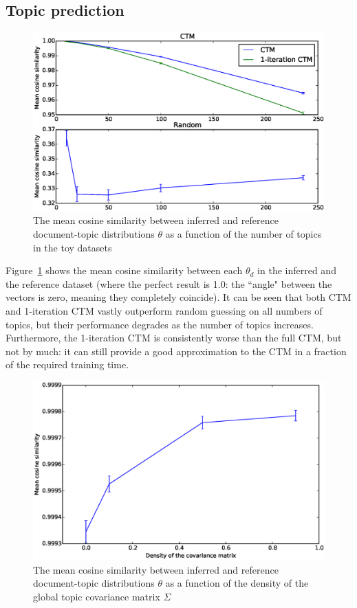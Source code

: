 \documentclass[12pt,a4paper,twoside,openright]{report}
\begin{document}
\subsection{Topic prediction}

\begin{figure}[!htb]
\includegraphics[width=\textwidth]{sim-cosine.eps}
\caption{The mean cosine similarity between inferred and reference document-topic distributions $\theta$ as a function of the number of topics in the toy datasets}
\label{fig:sim-cosine}
\end{figure}

Figure~\ref{fig:sim-cosine} shows the mean cosine similarity between each $\theta_d$ in the inferred and the reference dataset (where the perfect result is 1.0: the ``angle" between the vectors is zero, meaning they completely coincide). It can be seen that both CTM and 1-iteration CTM vastly outperform random guessing on all numbers of topics, but their performance degrades as the number of topics increases. Furthermore, the 1-iteration CTM is consistently worse than the full CTM, but not by much: it can still provide a good approximation to the CTM in a fraction of the required training time.

\begin{figure}[!htb]
\includegraphics[width=\textwidth]{sim-sigmadensity-cosine.eps}
\caption{The mean cosine similarity between inferred and reference document-topic distributions $\theta$ as a function of the density of the global topic covariance matrix $\Sigma$}
\label{fig:sim-sigmadensity-cosine}
\end{figure}
\end{document}
